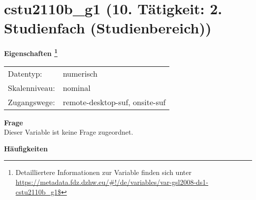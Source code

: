 
    \setcounter{footnote}{0}

    \vspace*{-1.8cm}
	\section{cstu2110b\_g1 (10. Tätigkeit: 2. Studienfach (Studienbereich))}
	\label{section:cstu2110b_g1}



    \vspace*{0.5cm}
    \noindent\textbf{Eigenschaften
	\footnote{Detailliertere Informationen zur Variable finden sich unter
		\url{https://metadata.fdz.dzhw.eu/\#!/de/variables/var-gsl2008-ds1-cstu2110b_g1$}}}\\
	\begin{tabularx}{\hsize}{@{}lX}
	Datentyp: & numerisch \\
	Skalenniveau: & nominal \\
	Zugangswege: &
	  remote-desktop-suf, 
	  onsite-suf
 \\
    \end{tabularx}



		\vspace*{0.5cm}
		\noindent\textbf{Frage}\\
		Dieser Variable ist keine Frage zugeordnet.





        		\vspace*{0.5cm}
                \noindent\textbf{Häufigkeiten}

